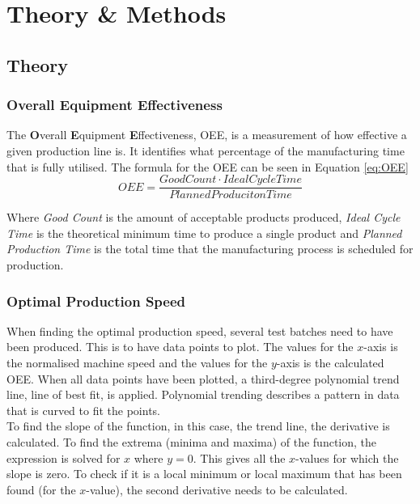 \section{Theory \& Methods}
\subsection{Theory}

\subsubsection{Overall Equipment Effectiveness}
The \textbf{O}verall \textbf{E}quipment \textbf{E}ffectiveness, OEE, is a
measurement of how effective a given production line is. It identifies what
percentage of the manufacturing time that is fully utilised. The formula for
the OEE can be seen in Equation \ref{eq:OEE}
\begin{equation} \label{eq:OEE}
    OEE = \frac{Good Count \cdot Ideal Cycle Time}{Planned Produciton Time}
\end{equation}

Where \textit{Good Count} is the amount of acceptable products produced,
\textit{Ideal Cycle Time} is the theoretical minimum time to produce a single
product and \textit{Planned Production Time} is the total time that the
manufacturing process is scheduled for production.

\subsubsection{Optimal Production Speed}
When finding the optimal production speed, several test batches need to have
been produced. This is to have data points to plot. The values for the
\(x\)-axis is the normalised machine speed and the values for the \(y\)-axis is
the calculated OEE. When all data points have been plotted, a third-degree
polynomial trend line, line of best fit, is applied. Polynomial trending
describes a pattern in data that is curved to fit the points.\\

To find the slope of the function, in this case, the trend line, the derivative
is calculated. To find the extrema (minima and maxima) of the function, the
expression is solved for \(x\) where \(y = 0\). This gives all the \(x\)-values
for which the slope is zero. To check if it is a local minimum or local maximum
that has been found (for the \(x\)-value), the second derivative needs to be
calculated.\\

